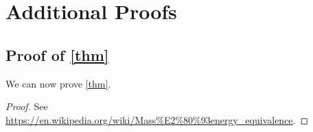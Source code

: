 \chapter{Additional Proofs}
\section{Proof of \autoref{thm}}\label{appendix}
We can now prove \autoref{thm}.
\begin{proof}
	See \url{https://en.wikipedia.org/wiki/Mass%E2%80%93energy_equivalence}.
\end{proof}